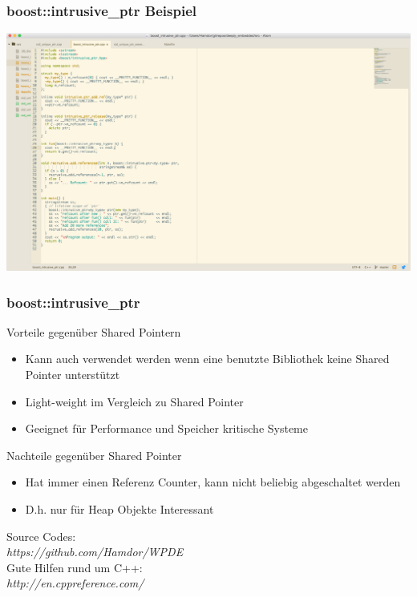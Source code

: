 \documentclass{beamer}
\begin{document}
\begin{frame}
 \frametitle{boost::intrusive\_ptr Beispiel}
 \includegraphics[scale=.21]{intrusive_ptr}	
\end{frame}

\begin{frame}
 \frametitle{boost::intrusive\_ptr}
 Vorteile gegenüber Shared Pointern
 \begin{itemize}
  \item Kann auch verwendet werden wenn eine benutzte Bibliothek keine Shared Pointer unterstützt
  \item Light-weight im Vergleich zu Shared Pointer
  \item Geeignet für Performance und Speicher kritische Systeme
 \end{itemize}
 Nachteile gegenüber Shared Pointer
 \begin{itemize}
 	\item Hat immer einen Referenz Counter, kann nicht beliebig abgeschaltet werden
 	\item D.h. nur für Heap Objekte Interessant
 \end{itemize}
\end{frame}

\begin{frame}
\center
Source Codes:\\
\textit{https://github.com/Hamdor/WPDE}\\
Gute Hilfen rund um C++:\\
\textit{http://en.cppreference.com/}
\end{frame}
\end{document}
